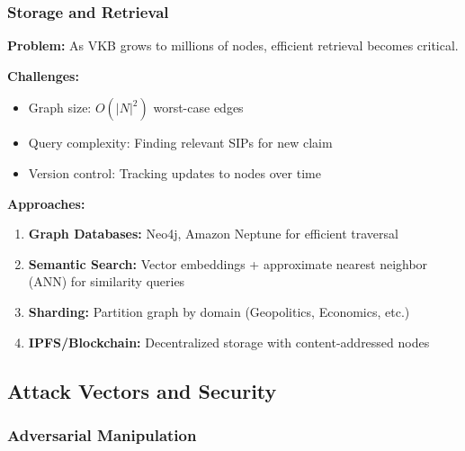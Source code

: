 \documentclass[11pt,a4paper]{article}
\theoremstyle{definition}
\theoremstyle{remark}
\newcommand{\VKB}{\textsc{VKB}}
\newcommand{\SIP}{\textsc{SIP}}
\begin{document}
\subsubsection{Storage and Retrieval}

\textbf{Problem:} As \VKB{} grows to millions of nodes, efficient retrieval becomes critical.

\textbf{Challenges:}
\begin{itemize}
    \item Graph size: $O(|N|^2)$ worst-case edges
    \item Query complexity: Finding relevant \SIP{}s for new claim
    \item Version control: Tracking updates to nodes over time
\end{itemize}

\textbf{Approaches:}
\begin{enumerate}
    \item \textbf{Graph Databases:} Neo4j, Amazon Neptune for efficient traversal
    \item \textbf{Semantic Search:} Vector embeddings + approximate nearest neighbor (ANN) for similarity queries
    \item \textbf{Sharding:} Partition graph by domain (Geopolitics, Economics, etc.)
    \item \textbf{IPFS/Blockchain:} Decentralized storage with content-addressed nodes
\end{enumerate}

\subsection{Attack Vectors and Security}

\subsubsection{Adversarial Manipulation}
\end{document}
